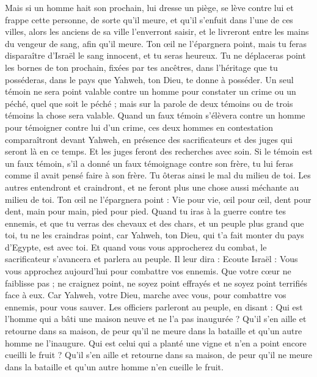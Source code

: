 \begin{multicols}{2}
Mais si un homme hait son prochain, lui dresse un piège, se lève contre lui et frappe cette personne, de sorte qu'il meure, et qu'il s'enfuit dans l'une de ces villes,
alors les anciens de sa ville l'enverront saisir, et le livreront entre les mains du vengeur de sang, afin qu'il meure.
Ton œil ne l'épargnera point, mais tu feras disparaître d'Israël le sang innocent, et tu seras heureux.
Tu ne déplaceras point les bornes de ton prochain, fixées par tes ancêtres, dans l'héritage que tu posséderas, dans le pays que Yahweh, ton Dieu, te donne à posséder.
Un seul témoin ne sera point valable contre un homme pour constater un crime ou un péché, quel que soit le péché ; mais sur la parole de deux témoins ou de trois témoins la chose sera valable.
Quand un faux témoin s'élèvera contre un homme pour témoigner contre lui d'un crime,
ces deux hommes en contestation comparaîtront devant Yahweh, en présence des sacrificateurs et des juges qui seront là en ce temps.
Et les juges feront des recherches avec soin. Si le témoin est un faux témoin, s'il a donné un faux témoignage contre son frère,
tu lui feras comme il avait pensé faire à son frère. Tu ôteras ainsi le mal du milieu de toi.
Les autres entendront et craindront, et ne feront plus une chose aussi méchante au milieu de toi.
Ton œil ne l'épargnera point : Vie pour vie, œil pour œil, dent pour dent, main pour main, pied pour pied.
\VerseOne{}Quand tu iras à la guerre contre tes ennemis, et que tu verras des chevaux et des chars, et un peuple plus grand que toi, tu ne les craindras point, car Yahweh, ton Dieu, qui t'a fait monter du pays d'Egypte, est avec toi.
Et quand vous vous approcherez du combat, le sacrificateur s'avancera et parlera au peuple.
Il leur dira : Ecoute Israël : Vous vous approchez aujourd'hui pour combattre vos ennemis. Que votre cœur ne faiblisse pas ; ne craignez point, ne soyez point effrayés et ne soyez point terrifiés face à eux.
Car Yahweh, votre Dieu, marche avec vous, pour combattre vos ennemis, pour vous sauver.
Les officiers parleront au peuple, en disant : Qui est l'homme qui a bâti une maison neuve et ne l'a pas inaugurée ? Qu'il s'en aille et retourne dans sa maison, de peur qu'il ne meure dans la bataille et qu'un autre homme ne l'inaugure.
Qui est celui qui a planté une vigne et n'en a point encore cueilli le fruit ? Qu'il s'en aille et retourne dans sa maison, de peur qu'il ne meure dans la bataille et qu'un autre homme n'en cueille le fruit.

\end{multicols}
